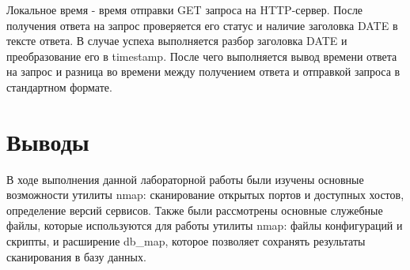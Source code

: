 \documentclass[12pt,a4paper]{report}
\begin{document}
Локальное время - время отправки GET запроса на HTTP-сервер. После получения ответа на запрос проверяется его статус и наличие заголовка DATE в тексте ответа.
В случае успеха выполняется разбор заголовка DATE и преобразование его в timestamp. После чего выполняется вывод времени ответа на запрос и разница во времени между получением ответа и отправкой запроса в стандартном формате.
\section{Выводы}
В ходе выполнения данной лабораторной работы были изучены основные возможности утилиты nmap: сканирование открытых портов и доступных хостов, определение версий сервисов. Также были рассмотрены основные служебные файлы, которые используются для работы утилиты nmap: файлы конфигураций и скрипты, и расширение db\_map, которое позволяет сохранять результаты сканирования в базу данных.
\end{document}
